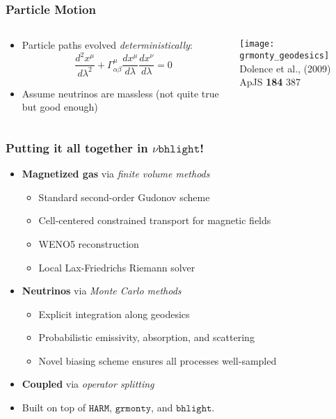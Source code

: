 \documentclass[]{beamer}
\begin{document}
\begin{frame}
  \frametitle{Particle Motion}
  \begin{columns}
    \begin{column}{6cm}
      \begin{itemize}
      \item Particle paths evolved \textit{deterministically}:
        $$\frac{d^2 x^\mu}{d\lambda^2} + \Gamma^\mu_{\alpha\beta} \frac{d x^\mu}{d\lambda} \frac{d x^\nu}{d \lambda} = 0$$
      \item Assume neutrinos are massless (not quite true but good enough)
      \end{itemize}
    \end{column}
    \begin{column}{6cm}
      \begin{center}
        \texttt{[image: grmonty\_geodesics]}\\
        {\tiny Dolence et al., (2009) ApJS \textbf{184} 387}
      \end{center}
    \end{column}
  \end{columns}
\end{frame}

\begin{frame}
  \frametitle{Putting it all together in $\nu\texttt{bhlight}$!}
  \begin{itemize}
  \item \textbf{Magnetized gas} via \textit{finite volume methods}
    \begin{itemize}
    \item Standard second-order Gudonov scheme
    \item Cell-centered constrained transport for magnetic fields
    \item WENO5 reconstruction
    \item Local Lax-Friedrichs Riemann solver
    \end{itemize}
  \item \textbf{Neutrinos} via \textit{Monte Carlo methods}
    \begin{itemize}
    \item Explicit integration along geodesics
    \item Probabilistic emissivity, absorption, and scattering
    \item Novel biasing scheme ensures all processes well-sampled
    \end{itemize}
  \item \textbf{Coupled} via \textit{operator splitting}
  \item Built on top of $\texttt{HARM}$, $\texttt{grmonty}$, and
    $\texttt{bhlight}$.
  \end{itemize}
\end{frame}
\end{document}
